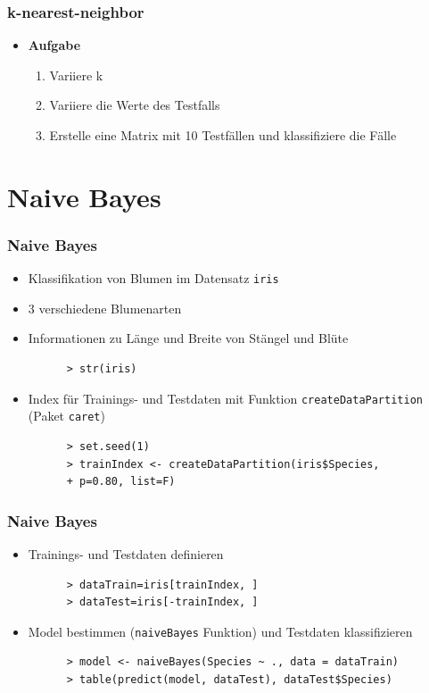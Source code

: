 \documentclass{beamer}
\begin{document}
\begin{frame}[fragile]
  \frametitle{k-nearest-neighbor}
  \begin{itemize}
    \item \textbf{Aufgabe} \\ 
         \begin{enumerate}
      		\item Variiere k
      		\item Variiere die Werte des Testfalls
      		\item Erstelle eine Matrix mit 10 Testfällen und klassifiziere die Fälle
    \end{enumerate}
  \end{itemize}
\end{frame}

\section{Naive Bayes}

\begin{frame}[fragile]
  \frametitle{Naive Bayes}
  \begin{itemize}
    \item Klassifikation von Blumen im Datensatz \Verb+iris+
    \item 3 verschiedene Blumenarten
    \item Informationen zu Länge und Breite von Stängel und Blüte
    \begin{Verbatim}
      > str(iris)
    \end{Verbatim}
    \item Index für Trainings- und Testdaten mit Funktion \Verb+createDataPartition+ (Paket \Verb+caret+)
    \begin{Verbatim}
      > set.seed(1)
      > trainIndex <- createDataPartition(iris$Species, 
      + p=0.80, list=F)
    \end{Verbatim}
  \end{itemize}
\end{frame}

\begin{frame}[fragile]
  \frametitle{Naive Bayes}
  \begin{itemize}
    \item Trainings- und Testdaten definieren
    \begin{Verbatim}
      > dataTrain=iris[trainIndex, ]
      > dataTest=iris[-trainIndex, ]
    \end{Verbatim}
    \item Model bestimmen (\Verb+naiveBayes+ Funktion) und Testdaten klassifizieren
    \begin{Verbatim}
      > model <- naiveBayes(Species ~ ., data = dataTrain)
      > table(predict(model, dataTest), dataTest$Species)
    \end{Verbatim}
  \end{itemize}
\end{frame}
\end{document}
